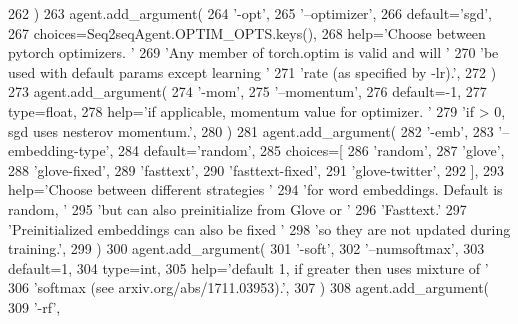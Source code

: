 \begin{DoxyCode}
262         )
263         agent.add\_argument(
264             \textcolor{stringliteral}{'-opt'},
265             \textcolor{stringliteral}{'--optimizer'},
266             default=\textcolor{stringliteral}{'sgd'},
267             choices=Seq2seqAgent.OPTIM\_OPTS.keys(),
268             help=\textcolor{stringliteral}{'Choose between pytorch optimizers. '}
269             \textcolor{stringliteral}{'Any member of torch.optim is valid and will '}
270             \textcolor{stringliteral}{'be used with default params except learning '}
271             \textcolor{stringliteral}{'rate (as specified by -lr).'},
272         )
273         agent.add\_argument(
274             \textcolor{stringliteral}{'-mom'},
275             \textcolor{stringliteral}{'--momentum'},
276             default=-1,
277             type=float,
278             help=\textcolor{stringliteral}{'if applicable, momentum value for optimizer. '}
279             \textcolor{stringliteral}{'if > 0, sgd uses nesterov momentum.'},
280         )
281         agent.add\_argument(
282             \textcolor{stringliteral}{'-emb'},
283             \textcolor{stringliteral}{'--embedding-type'},
284             default=\textcolor{stringliteral}{'random'},
285             choices=[
286                 \textcolor{stringliteral}{'random'},
287                 \textcolor{stringliteral}{'glove'},
288                 \textcolor{stringliteral}{'glove-fixed'},
289                 \textcolor{stringliteral}{'fasttext'},
290                 \textcolor{stringliteral}{'fasttext-fixed'},
291                 \textcolor{stringliteral}{'glove-twitter'},
292             ],
293             help=\textcolor{stringliteral}{'Choose between different strategies '}
294             \textcolor{stringliteral}{'for word embeddings. Default is random, '}
295             \textcolor{stringliteral}{'but can also preinitialize from Glove or '}
296             \textcolor{stringliteral}{'Fasttext.'}
297             \textcolor{stringliteral}{'Preinitialized embeddings can also be fixed '}
298             \textcolor{stringliteral}{'so they are not updated during training.'},
299         )
300         agent.add\_argument(
301             \textcolor{stringliteral}{'-soft'},
302             \textcolor{stringliteral}{'--numsoftmax'},
303             default=1,
304             type=int,
305             help=\textcolor{stringliteral}{'default 1, if greater then uses mixture of '}
306             \textcolor{stringliteral}{'softmax (see arxiv.org/abs/1711.03953).'},
307         )
308         agent.add\_argument(
309             \textcolor{stringliteral}{'-rf'},

\end{DoxyCode}
